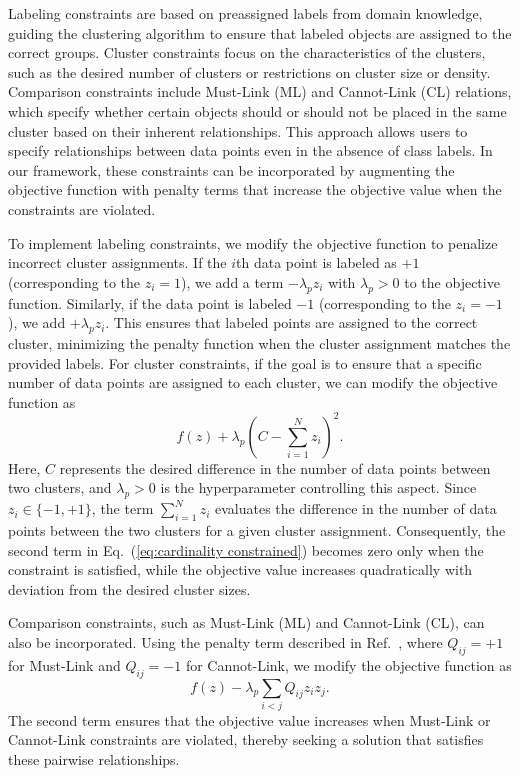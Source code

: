\documentclass[showpacs,twocolumn,superscriptaddress]{revtex4-2}
\begin{document}
Labeling constraints are based on preassigned labels from domain knowledge, guiding the clustering algorithm to ensure that labeled objects are assigned to the correct groups. Cluster constraints focus on the characteristics of the clusters, such as the desired number of clusters or restrictions on cluster size or density. Comparison constraints include Must-Link (ML) and Cannot-Link (CL) relations, which specify whether certain objects should or should not be placed in the same cluster based on their inherent relationships. This approach allows users to specify relationships between data points even in the absence of class labels. In our framework, these constraints can be incorporated by augmenting the objective function with penalty terms that increase the objective value when the constraints are violated.

To implement labeling constraints, we modify the objective function to penalize incorrect cluster assignments. If the $i$th data point is labeled as $+1$ (corresponding to the $z_i = 1$), we add a term $- \lambda_p z_i$ with $\lambda_p > 0$ to the objective function. Similarly, if the data point is labeled $-1$ (corresponding to the $z_i = -1$), we add $+\lambda_p z_i$. This ensures that labeled points are assigned to the correct cluster, minimizing the penalty function when the cluster assignment matches the provided labels.
For cluster constraints, if the goal is to ensure that a specific number of data points are assigned to each cluster, we can modify the objective function as
\begin{equation}
\label{eq:cardinality constrained}
    f(z) + \lambda_{p}\left(C-\sum_{i=1}^{N}z_i\right)^2.
\end{equation}
Here, $C$ represents the desired difference in the number of data points between two clusters, and $\lambda_{p}>0$ is the hyperparameter controlling this aspect. Since $z_i\in\{ -1,+1\}$, the term $\sum_{i=1}^N z_i$ evaluates the difference in the number of data points between the two clusters for a given cluster assignment. Consequently, the second term in Eq.~(\ref{eq:cardinality constrained}) becomes zero only when the constraint is satisfied, while the objective value increases quadratically with deviation from the desired cluster sizes.

Comparison constraints, such as Must-Link (ML) and Cannot-Link (CL), can also be incorporated. Using the penalty term described in Ref.~\cite{wang2010flexible}, where $Q_{ij}=+1$ for Must-Link and $Q_{ij}=-1$ for Cannot-Link, we modify the objective function as
\begin{equation}
    \label{eq:MLandCL constrained}
    f(z) - \lambda_{p} \sum_{i<j} Q_{ij} z_i z_j.
\end{equation}
The second term ensures that the objective value increases when Must-Link or Cannot-Link constraints are violated, thereby seeking a solution that satisfies these pairwise relationships.
\end{document}
